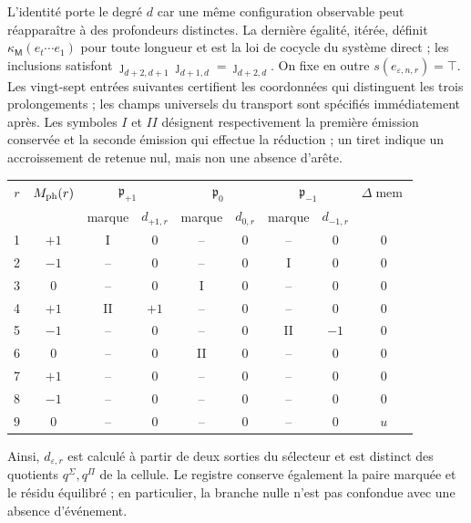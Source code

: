 L’identité porte le degré \(d\) car une même configuration observable
peut réapparaître à des profondeurs distinctes. La dernière égalité, itérée, définit
\(\kappa_{\mathsf M}(e_t\cdots e_1)\) pour toute longueur et est la loi de
cocycle du système direct ; les inclusions satisfont
\(\jmath_{d+2,d+1}\jmath_{d+1,d}=\jmath_{d+2,d}\).
On fixe en outre
\(s(e_{\varepsilon,n,r})=\top\). Les vingt-sept entrées suivantes
certifient les coordonnées qui distinguent les trois prolongements ; les champs
universels du transport sont spécifiés immédiatement après. Les symboles \(I\) et \(II\)
désignent respectivement la première émission conservée et la seconde émission
qui effectue la réduction ; un tiret indique un accroissement de retenue nul, mais non
une absence d’arête.
\begin{center}
\small
\setlength{\tabcolsep}{3.2pt}
\begin{tabular}{c c cc cc cc c}
\toprule
\(r\)&\(M_{\rm ph}(r)\)&\multicolumn{2}{c}{\(\mathfrak p_{+1}\)}&
\multicolumn{2}{c}{\(\mathfrak p_0\)}&
\multicolumn{2}{c}{\(\mathfrak p_{-1}\)}&
\(\Delta\operatorname{mem}\)\\
& &marque&\(d_{+1,r}\)&marque&\(d_{0,r}\)&marque&\(d_{-1,r}\)&\\
\midrule
1&\(+1\)&I&0&--&0&--&0&0\\
2&\(-1\)&--&0&--&0&I&0&0\\
3&0&--&0&I&0&--&0&0\\
4&\(+1\)&II&\(+1\)&--&0&--&0&0\\
5&\(-1\)&--&0&--&0&II&\(-1\)&0\\
6&0&--&0&II&0&--&0&0\\
7&\(+1\)&--&0&--&0&--&0&0\\
8&\(-1\)&--&0&--&0&--&0&0\\
9&0&--&0&--&0&--&0&\(u\)\\
\bottomrule
\end{tabular}
\end{center}
Ainsi, \(d_{\varepsilon,r}\) est calculé à partir de deux sorties du sélecteur et
est distinct des quotients \(q^\Sigma,q^\Pi\) de la cellule. Le registre
conserve également la paire marquée et le résidu équilibré ; en particulier, la
branche nulle n’est pas confondue avec une absence d’événement.


